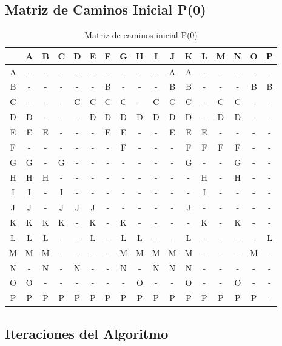 \documentclass[12pt]{article}
\begin{document}
\subsection{Matriz de Caminos Inicial P(0)}
\begin{table}[h!]
\centering
\begin{tabular}{|c|c|c|c|c|c|c|c|c|c|c|c|c|c|c|c|c|}
\hline
 & A & B & C & D & E & F & G & H & I & J & K & L & M & N & O & P \\\hline
A & - & - & - & - & - & - & - & - & - & A & A & - & - & - & - & - \\\hline
B & - & - & - & - & - & B & - & - & - & B & B & - & - & - & B & B \\\hline
C & - & - & - & C & C & C & C & - & C & C & C & - & C & C & - & - \\\hline
D & D & - & - & - & D & D & D & D & D & D & D & - & D & D & - & - \\\hline
E & E & E & - & - & - & E & E & - & - & E & E & E & - & - & - & - \\\hline
F & - & - & - & - & - & - & F & - & - & - & F & F & F & F & - & - \\\hline
G & G & - & G & - & - & - & - & - & - & - & G & - & - & G & - & - \\\hline
H & H & H & - & - & - & - & - & - & - & - & - & H & - & H & - & - \\\hline
I & I & - & I & - & - & - & - & - & - & - & - & I & - & - & - & - \\\hline
J & J & - & J & J & J & - & - & - & - & - & J & - & - & - & - & - \\\hline
K & K & K & K & - & K & - & K & - & - & - & - & K & - & K & - & - \\\hline
L & L & L & - & - & L & - & L & L & - & - & L & - & - & - & - & L \\\hline
M & M & M & - & - & - & - & M & M & M & M & M & - & - & - & M & - \\\hline
N & - & N & - & N & - & - & N & - & N & N & N & - & - & - & - & - \\\hline
O & O & - & - & - & - & - & - & O & - & - & O & - & - & O & - & - \\\hline
P & P & P & P & P & P & P & P & P & P & P & P & P & P & P & P & - \\\hline
\end{tabular}
\caption{Matriz de caminos inicial P(0)}
\end{table}

\clearpage
\subsection{Iteraciones del Algoritmo}
\end{document}
